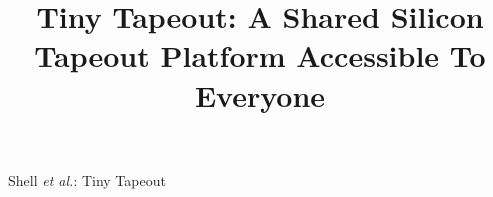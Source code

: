 \documentclass[journal]{IEEEtran}
\begin{document}

\title{Tiny Tapeout: A Shared Silicon Tapeout Platform Accessible To Everyone}



%
{Shell \MakeLowercase{\textit{et al.}}: Tiny Tapeout}


\maketitle



%
%
%
%
%
%
%
%
%












%

%






\end{document}
